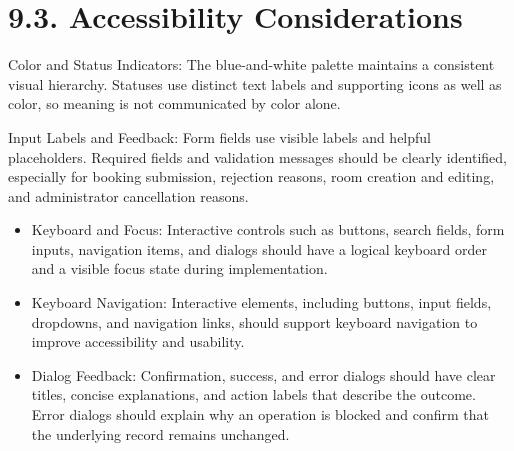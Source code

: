 \section*{9.3. Accessibility
Considerations}\label{accessibility-considerations}

Color and Status Indicators: The blue-and-white palette maintains a
consistent visual hierarchy. Statuses use distinct text labels and
supporting icons as well as color, so meaning is not communicated by
color alone.

Input Labels and Feedback: Form fields use visible labels and helpful
placeholders. Required fields and validation messages should be clearly
identified, especially for booking submission, rejection reasons, room
creation and editing, and administrator cancellation reasons.

\begin{itemize}
\item
  Keyboard and Focus: Interactive controls such as buttons, search
  fields, form inputs, navigation items, and dialogs should have a
  logical keyboard order and a visible focus state during
  implementation.
\item
  Keyboard Navigation: Interactive elements, including buttons, input
  fields, dropdowns, and navigation links, should support keyboard
  navigation to improve accessibility and usability.
\item
  Dialog Feedback: Confirmation, success, and error dialogs should have
  clear titles, concise explanations, and action labels that describe
  the outcome. Error dialogs should explain why an operation is blocked
  and confirm that the underlying record remains unchanged.
\end{itemize}
